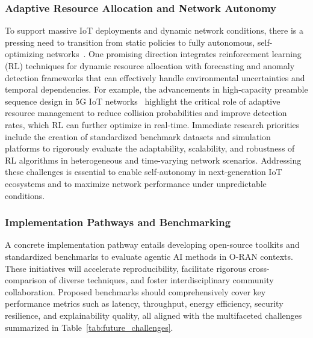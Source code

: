 \documentclass[sigconf]{acmart}
\begin{document}
\subsubsection{Adaptive Resource Allocation and Network Autonomy}
To support massive IoT deployments and dynamic network conditions, there is a pressing need to transition from static policies to fully autonomous, self-optimizing networks~\cite{ref21}. One promising direction integrates reinforcement learning (RL) techniques for dynamic resource allocation with forecasting and anomaly detection frameworks that can effectively handle environmental uncertainties and temporal dependencies. For example, the advancements in high-capacity preamble sequence design in 5G IoT networks~\cite{ref21} highlight the critical role of adaptive resource management to reduce collision probabilities and improve detection rates, which RL can further optimize in real-time. Immediate research priorities include the creation of standardized benchmark datasets and simulation platforms to rigorously evaluate the adaptability, scalability, and robustness of RL algorithms in heterogeneous and time-varying network scenarios. Addressing these challenges is essential to enable self-autonomy in next-generation IoT ecosystems and to maximize network performance under unpredictable conditions.

\subsubsection{Implementation Pathways and Benchmarking}
A concrete implementation pathway entails developing open-source toolkits and standardized benchmarks to evaluate agentic AI methods in O-RAN contexts. These initiatives will accelerate reproducibility, facilitate rigorous cross-comparison of diverse techniques, and foster interdisciplinary community collaboration. Proposed benchmarks should comprehensively cover key performance metrics such as latency, throughput, energy efficiency, security resilience, and explainability quality, all aligned with the multifaceted challenges summarized in Table~\ref{tab:future_challenges}.
\end{document}
